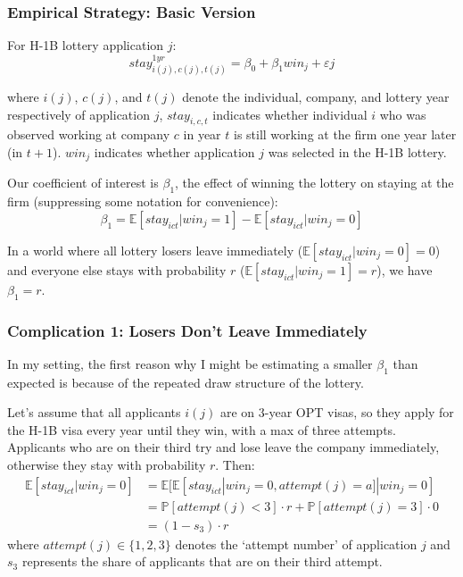 \documentclass[xcolor=dvipsnames, compress, 12pt, aspectratio=169, handout]{beamer}
\begin{document}
\appendix
\begin{frame}
    \frametitle{Empirical Strategy: Basic Version}
For H-1B lottery application $j$:
\begin{equation*}
    stay^{1yr}_{i(j), c(j), t(j)} = \beta_0 + \beta_1 win_{j} + \varepsilon{j}
\end{equation*}

where $i(j)$, $c(j)$, and $t(j)$ denote the individual, company, and lottery year respectively of application $j$, $stay_{i,c,t}$ indicates whether individual $i$ who was observed working at company $c$ in year $t$ is still working at the firm one year later (in $t+1$). $win_{j}$ indicates whether application $j$ was selected in the H-1B lottery.

\vspace{2mm}
Our coefficient of interest is $\beta_1$, the effect of winning the lottery on staying at the firm (suppressing some notation for convenience):
\begin{equation*}
    \beta_1 = \mathbb{E}[stay_{ict}|win_j = 1] - \mathbb{E}[stay_{ict}|win_j = 0]
\end{equation*} 
\vspace{2mm}

In a world where all lottery losers leave immediately ($\mathbb{E}[stay_{ict}|win_j = 0] = 0$) and everyone else stays with probability $r$ ($\mathbb{E}[stay_{ict}|win_j = 1] = r$), we have $\beta_1 = r$. 

\end{frame}

\begin{frame}
\frametitle{Complication 1: Losers Don't Leave Immediately}
In my setting, the first reason why I might be estimating a smaller $\beta_1$ than expected is because of the repeated draw structure of the lottery.
\vspace{2mm}

Let's assume that all applicants $i(j)$ are on 3-year OPT visas, so they apply for the H-1B visa every year until they win, with a max of three attempts. Applicants who are on their third try and lose leave the company immediately, otherwise they stay with probability $r$. Then:
\begin{align*}
    \mathbb{E}[stay_{ict}|win_j = 0] &= \mathbb{E}[\mathbb{E}[stay_{ict}|win_j=0, attempt(j) = a] | win_j = 0] \\
    &= \mathbb{P}[attempt(j) < 3] \cdot r + \mathbb{P}[attempt(j) = 3] \cdot 0 \\
    &= (1-s_3) \cdot r
\end{align*} 
where $attempt(j) \in \{1,2,3\}$ denotes the `attempt number' of application $j$ and $s_3$ represents the share of applicants that are on their third attempt.
\end{frame}
\end{document}

